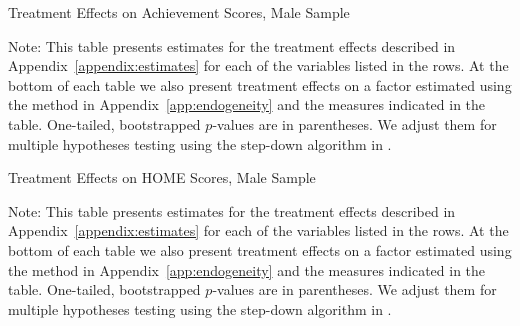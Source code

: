 	\begin{table}[H]
     \caption{Treatment Effects on Achievement Scores, Male Sample}
     \label{table:abccare_rslt_male_cat1_sd}
	
	\end{table} 
\begin{spacing}{1}
\begin{footnotesize}
\noindent Note: This table presents estimates for the treatment effects described in Appendix~\ref{appendix:estimates} for each of the variables listed in the rows. At the bottom of each table we also present treatment effects on a factor estimated using the method in Appendix~\ref{app:endogeneity} and the measures indicated in the table. One-tailed, bootstrapped $p$-values are in parentheses. We adjust them for multiple hypotheses testing using the step-down algorithm in \citet{Romano_Wolf_2016_pval_SaPL}. 
\end{footnotesize}
\end{spacing}

	\begin{table}[H]
     \caption{Treatment Effects on HOME Scores, Male Sample}
     \label{table:abccare_rslt_male_cat2_sd}
	
	\end{table} 
\begin{spacing}{1}
\begin{footnotesize}
\noindent Note: This table presents estimates for the treatment effects described in Appendix~\ref{appendix:estimates} for each of the variables listed in the rows. At the bottom of each table we also present treatment effects on a factor estimated using the method in Appendix~\ref{app:endogeneity} and the measures indicated in the table. One-tailed, bootstrapped $p$-values are in parentheses. We adjust them for multiple hypotheses testing using the step-down algorithm in \citet{Romano_Wolf_2016_pval_SaPL}. 
\end{footnotesize}
\end{spacing}


